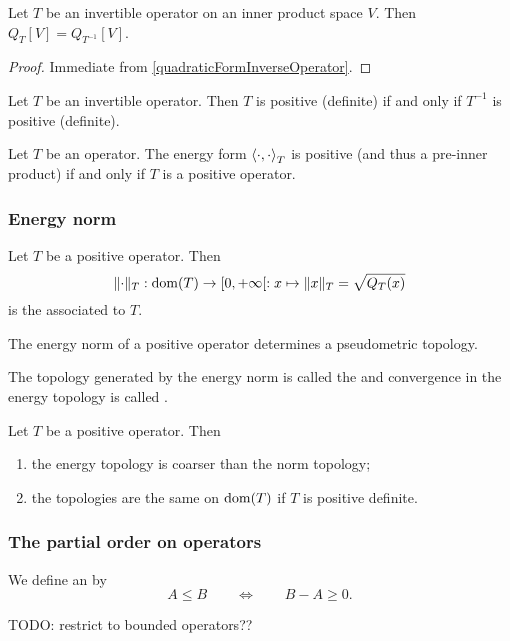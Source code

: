 \begin{lemma}
Let $T$ be an invertible operator on an inner product space $V$. Then $Q_T[V] = Q_{T^{-1}}[V]$.
\end{lemma}
\begin{proof}
Immediate from \ref{quadraticFormInverseOperator}.
\end{proof}
\begin{corollary}
Let $T$ be an invertible operator. Then $T$ is positive (definite) \textup{if and only if} $T^{-1}$ is positive (definite).
\end{corollary}

\begin{lemma} \label{positiveOperatorPositiveEnergyForm}
Let $T$ be an operator. The energy form $\left\langle \cdot,\cdot \right\rangle_T$ is positive (and thus a pre-inner product) \textup{if and only if} $T$ is a positive operator.
\end{lemma}

\subsubsection{Energy norm}
\begin{definition}
Let $T$ be a positive operator. Then
\[ \lVert\cdot\rVert_T: \operatorname{dom}(T) \to [0,+\infty[: x\mapsto \lVert x\rVert_T = \sqrt{Q_T(x)} \]
is the  associated to $T$.
\end{definition}

\begin{lemma}
The energy norm of a positive operator determines a pseudometric topology.
\end{lemma}

\begin{definition}
The topology generated by the energy norm is called the  and convergence in the energy topology is called .
\end{definition}

\begin{proposition}
Let $T$ be a positive operator. Then
\begin{enumerate}
\item the energy topology is coarser than the norm topology;
\item the topologies are the same on $\operatorname{dom}(T)$ if $T$ is positive definite.
\end{enumerate}
\end{proposition}

\subsubsection{The partial order on operators}
\begin{definition}
We define an  by
\[ A\leq B \qquad\iff\qquad B-A \geq 0. \]
\end{definition}
TODO: restrict to bounded operators??

